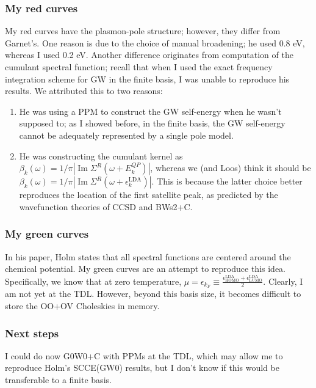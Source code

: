 \subsubsection{My red curves}
 My red curves have the plasmon-pole structure; however, they differ from Garnet's. One reason is due to the choice of manual broadening; he used 0.8 eV, whereas I used 0.2 eV. Another difference originates from computation of the cumulant spectral function; recall that when I used the exact frequency integration scheme for GW in the finite basis, I was unable to reproduce his results. We attributed this to two reasons:
\begin{enumerate}
    \item He was using a PPM to construct the GW self-energy when he wasn't supposed to; as I showed before, in the finite basis, the GW self-energy cannot be adequately represented by a single pole model. 
    \item He was constructing the cumulant kernel as $\beta_k(\omega) = 1/\pi |\operatorname{Im} \Sigma^R(\omega+E^{QP}_k)|$, whereas we (and Loos) think it should be $\beta_k(\omega) = 1/\pi |\operatorname{Im} \Sigma^R(\omega+\epsilon^{\text{LDA}}_k)|$. This is because the latter choice better reproduces the location of the first satellite peak, as predicted by the wavefunction theories of CCSD and BWs2+C. 
\end{enumerate}

\subsubsection{My green curves}
In his paper, Holm states that all spectral functions are centered around the chemical potential. My green curves are an attempt to reproduce this idea. Specifically, we know that at zero temperature, $\mu = \epsilon_{k_F}\equiv \frac{\epsilon_{\text{HOMO}}^{\text{LDA}} + \epsilon_{\text{LUMO}}^{\text{LDA}}}{2}$. Clearly, I am not yet at the TDL. However, beyond this basis size, it becomes difficult to store the OO+OV Choleskies in memory.
\subsubsection{Next steps}
I could do now G0W0+C with PPMs at the TDL, which may allow me to reproduce Holm's SCCE(GW0) results, but I don't know if this would be transferable to a finite basis.

